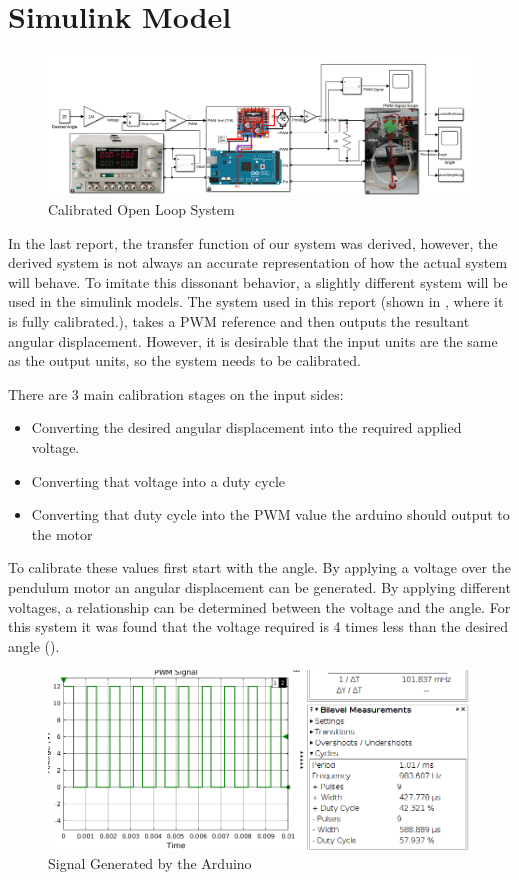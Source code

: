 \documentclass[a4paper, 11pt, compsoc]{IEEEtran}
\begin{document}
	\section{Simulink Model}\label{sec:model}
		\begin{figure}[!ht]
			\centering
			\includegraphics[width=\columnwidth]{lab4System.png}
			\caption{Calibrated Open Loop System}
			\label{fig:baseSystem}
		\end{figure}
		In the last report, the transfer function of our system was derived, however, the derived system is not always an accurate representation of how the actual system will behave. To imitate this dissonant behavior, a slightly different system will be used in the simulink models. The system used in this report (shown in , where it is fully calibrated.), takes a PWM reference and then outputs the resultant angular displacement. However, it is desirable that the input units are the same as the output units, so the system needs to be calibrated.
		\par
		There are 3 main calibration stages on the input sides:
		\begin{itemize}
			\item Converting the desired angular displacement into the required applied voltage.
			\item Converting that voltage into a duty cycle
			\item Converting that duty cycle into the PWM value the arduino should output to the motor
		\end{itemize}
		To calibrate these values first start with the angle. By applying a voltage over the pendulum motor an angular displacement can be generated. By applying different voltages, a relationship can be determined between the voltage and the angle. For this system it was found that the voltage required is 4 times less than the desired angle ().
		\par
		\begin{figure}[!ht]
			\centering
			\includegraphics[width=\columnwidth]{dutyCycleSignal.png}
			\caption{Signal Generated by the Arduino}
			\label{fig:signal}
		\end{figure}
\end{document}
